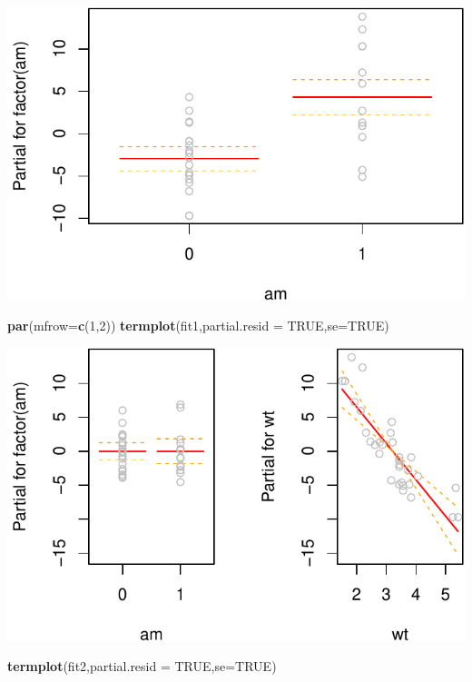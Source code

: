 \documentclass[]{article}
\newenvironment{Shaded}{\begin{snugshade}}{\end{snugshade}}
\newcommand{\KeywordTok}[1]{\textcolor[rgb]{0.13,0.29,0.53}{\textbf{{#1}}}}
\newcommand{\DataTypeTok}[1]{\textcolor[rgb]{0.13,0.29,0.53}{{#1}}}
\newcommand{\DecValTok}[1]{\textcolor[rgb]{0.00,0.00,0.81}{{#1}}}
\newcommand{\OtherTok}[1]{\textcolor[rgb]{0.56,0.35,0.01}{{#1}}}
\newcommand{\NormalTok}[1]{{#1}}
\numberwithin{equation}{section}
\begin{document}
\includegraphics{tema6_files/figure-latex/unnamed-chunk-43-1.pdf}

\begin{Shaded}
\begin{Highlighting}[]
\KeywordTok{par}\NormalTok{(}\DataTypeTok{mfrow=}\KeywordTok{c}\NormalTok{(}\DecValTok{1}\NormalTok{,}\DecValTok{2}\NormalTok{))}
\KeywordTok{termplot}\NormalTok{(fit1,}\DataTypeTok{partial.resid =} \OtherTok{TRUE}\NormalTok{,}\DataTypeTok{se=}\OtherTok{TRUE}\NormalTok{)}
\end{Highlighting}
\end{Shaded}

\includegraphics{tema6_files/figure-latex/unnamed-chunk-44-1.pdf}

\begin{Shaded}
\begin{Highlighting}[]
\KeywordTok{termplot}\NormalTok{(fit2,}\DataTypeTok{partial.resid =} \OtherTok{TRUE}\NormalTok{,}\DataTypeTok{se=}\OtherTok{TRUE}\NormalTok{)}
\end{Highlighting}
\end{Shaded}
\end{document}
